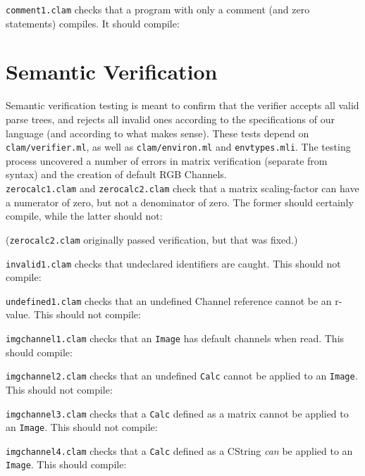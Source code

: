 \texttt{comment1.clam} checks that a program with only a comment (and zero statements) compiles. It should compile:


\section{Semantic Verification}
\label{testing:semantic}

Semantic verification testing is meant to confirm that the verifier accepts all valid parse trees,
and rejects all invalid ones according to the specifications of our language
(and according to what makes sense).
These tests depend on \texttt{clam/verifier.ml}, as well as \texttt{clam/environ.ml} and \texttt{envtypes.mli}. 
The testing process uncovered a number of errors in matrix verification (separate from syntax)
and the creation of default RGB Channels.\\

\texttt{zerocalc1.clam} and \texttt{zerocalc2.clam} check that a matrix scaling-factor can
have a numerator of zero, but not a denominator of zero.
The former should certainly compile, while the latter should not:


(\texttt{zerocalc2.clam} originally passed verification, but that was fixed.)

\texttt{invalid1.clam} checks that undeclared identifiers are caught. This should not compile:


\texttt{undefined1.clam} checks that an undefined Channel reference cannot be an r-value. This should not compile:


\texttt{imgchannel1.clam} checks that an \texttt{Image} has default channels when read. This should compile:


\texttt{imgchannel2.clam} checks that an undefined \texttt{Calc} cannot be applied to an \texttt{Image}. This should not compile:


\texttt{imgchannel3.clam} checks that a \texttt{Calc} defined as a matrix cannot be applied to an \texttt{Image}. This should not compile:


\texttt{imgchannel4.clam} checks that a \texttt{Calc} defined as a CString \emph{can} be applied to an \texttt{Image}. This should compile:


